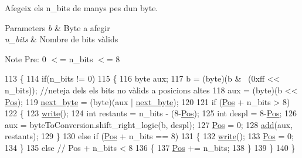 Afegeix els n\+\_\+bits de manys pes d\textquotesingle{}un byte. 


\begin{DoxyParams}{Parameters}
{\em b} & Byte a afegir \\
\hline
{\em n\+\_\+bits} & Nombre de bits vàlids \\
\hline
\end{DoxyParams}
\begin{DoxyNote}{Note}
Pre\+: 0 $<$= n\+\_\+bits $<$= 8 
\end{DoxyNote}

\begin{DoxyCode}
113     \{
114         \textcolor{keywordflow}{if}(n\_bits != 0)
115         \{
116             byte aux;
117             b = (byte)(b & ~(0xff << n\_bits)); \textcolor{comment}{//neteja dels els bits no vàlids a posicions altes}
118             aux = (byte)(b << \hyperlink{classpersistencia_1_1output_1_1Output_a3709182600423f7e57644ccdd0016f22}{Pos});
119             \hyperlink{classpersistencia_1_1output_1_1Output_aca83082ef84ec2e169b6fa34618d0773}{next\_byte} = (byte)(aux | \hyperlink{classpersistencia_1_1output_1_1Output_aca83082ef84ec2e169b6fa34618d0773}{next\_byte});
120             
121             \textcolor{keywordflow}{if} (\hyperlink{classpersistencia_1_1output_1_1Output_a3709182600423f7e57644ccdd0016f22}{Pos} + n\_bits > 8) 
122             \{
123                 \hyperlink{classpersistencia_1_1output_1_1Output_a57be8c4ed429f03caa5c2bcc97e2260d}{write}();
124                 \textcolor{keywordtype}{int} restants = n\_bits - (8-\hyperlink{classpersistencia_1_1output_1_1Output_a3709182600423f7e57644ccdd0016f22}{Pos});
125                 \textcolor{keywordtype}{int} despl = 8-\hyperlink{classpersistencia_1_1output_1_1Output_a3709182600423f7e57644ccdd0016f22}{Pos};
126                 aux = byteToConversion.shift\_right\_logic(b, despl);
127                 \hyperlink{classpersistencia_1_1output_1_1Output_a3709182600423f7e57644ccdd0016f22}{Pos} = 0;
128                 \hyperlink{classpersistencia_1_1output_1_1Output_adc03a0dd7a94da21fe8432064a4eec09}{add}(aux, restants);
129             \}
130             \textcolor{keywordflow}{else} \textcolor{keywordflow}{if} (\hyperlink{classpersistencia_1_1output_1_1Output_a3709182600423f7e57644ccdd0016f22}{Pos} + n\_bits == 8) 
131             \{
132                 \hyperlink{classpersistencia_1_1output_1_1Output_a57be8c4ed429f03caa5c2bcc97e2260d}{write}();
133                 \hyperlink{classpersistencia_1_1output_1_1Output_a3709182600423f7e57644ccdd0016f22}{Pos} = 0;
134             \}
135             \textcolor{keywordflow}{else} \textcolor{comment}{// Pos + n\_bits < 8}
136             \{
137                 \hyperlink{classpersistencia_1_1output_1_1Output_a3709182600423f7e57644ccdd0016f22}{Pos} += n\_bits;
138             \}
139         \}
140     \}
\end{DoxyCode}
\mbox{\label{classpersistencia_1_1output_1_1Output_a0882482880e36bf5dc9bd78bb36cec75}} 
